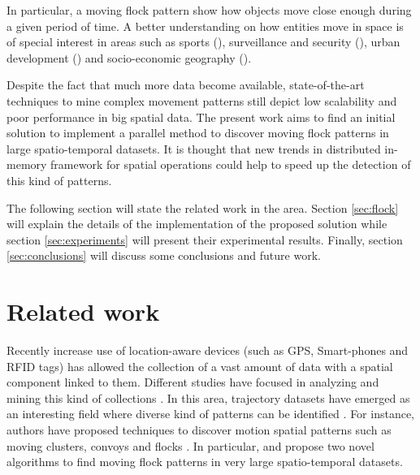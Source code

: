 \documentclass[12pt]{scrartcl}
\begin{document}
In particular, a moving flock pattern show how objects move close enough during a given period of time.  A better understanding on how entities move in space is of special interest in areas such as sports (\cite{iwase_tracking_2002}),  surveillance and security (\cite{makris_path_2002,piciarelli_trajectory_2005}), urban development (\cite{huang_trajgraph:_2016, long_combining_2015}) and socio-economic geography (\cite{frank_life_2000}).

Despite the fact that much more data become available, state-of-the-art techniques to mine complex movement patterns still depict low scalability and poor performance in big spatial data.  The present work aims to find an initial solution to implement a parallel method to discover moving flock patterns in large spatio-temporal datasets.  It is thought that new trends in distributed in-memory framework for spatial operations could help to speed up the detection of this kind of patterns.

The following section will state the related work in the area.  Section \ref{sec:flock} will explain the details of the implementation of the proposed solution while section \ref{sec:experiments} will present their experimental results. Finally, section \ref{sec:conclusions} will discuss some conclusions and future work. 

\section{Related work}
% 

Recently increase use of location-aware devices (such as GPS, Smart-phones and RFID tags) has allowed the collection of a vast amount of data with a spatial component linked to them.  Different studies have focused in analyzing and mining this kind of collections \citep{leung_knowledge_2010}\citep{miller_geographic_2001}.  In this area, trajectory datasets have emerged as an interesting field where diverse kind of patterns can be identified \citep{zheng_computing_2011}\citep{vieira_spatio-temporal_2013}.  For instance, authors have proposed techniques to discover motion spatial patterns such as moving clusters\citep{kalnis_discovering_2005}, convoys\citep{jeung_discovery_2008} and flocks \citep{benkert_reporting_2008}\citep{gudmundsson_computing_2006}.  In particular, \citep{vieira_-line_2009} and \citep{turdukulov_visual_2014} propose two novel algorithms to find moving flock patterns in very large spatio-temporal datasets.  
 
\end{document}
